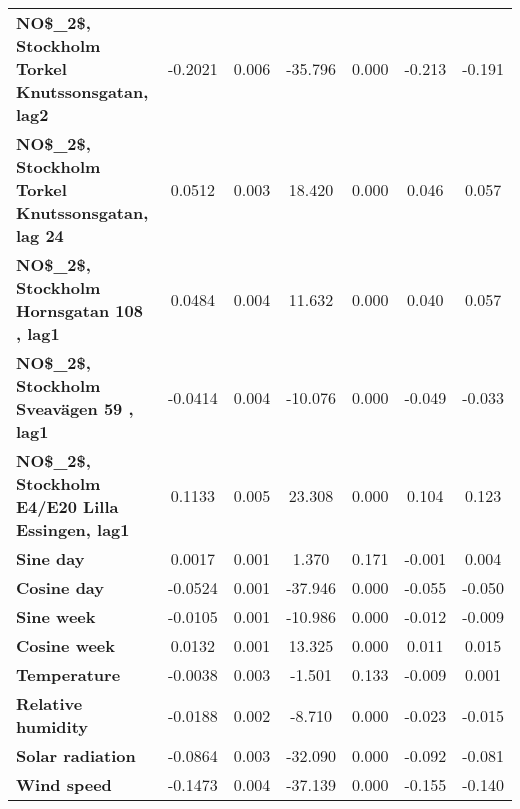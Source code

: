 \begin{landscape}
\begin{table}
\begin{center}
\begin{tabular}{lcccccc}
\textbf{NO\$\_2\$, Stockholm Torkel Knutssonsgatan, lag2}   &      -0.2021  &        0.006     &   -35.796  &         0.000        &       -0.213    &       -0.191     \\
\textbf{NO\$\_2\$, Stockholm Torkel Knutssonsgatan, lag 24} &       0.0512  &        0.003     &    18.420  &         0.000        &        0.046    &        0.057     \\
\textbf{NO\$\_2\$, Stockholm Hornsgatan 108 , lag1}         &       0.0484  &        0.004     &    11.632  &         0.000        &        0.040    &        0.057     \\
\textbf{NO\$\_2\$, Stockholm Sveavägen 59 , lag1}           &      -0.0414  &        0.004     &   -10.076  &         0.000        &       -0.049    &       -0.033     \\
\textbf{NO\$\_2\$, Stockholm E4/E20 Lilla Essingen, lag1}   &       0.1133  &        0.005     &    23.308  &         0.000        &        0.104    &        0.123     \\
\textbf{Sine day}                                           &       0.0017  &        0.001     &     1.370  &         0.171        &       -0.001    &        0.004     \\
\textbf{Cosine day}                                         &      -0.0524  &        0.001     &   -37.946  &         0.000        &       -0.055    &       -0.050     \\
\textbf{Sine week}                                          &      -0.0105  &        0.001     &   -10.986  &         0.000        &       -0.012    &       -0.009     \\
\textbf{Cosine week}                                        &       0.0132  &        0.001     &    13.325  &         0.000        &        0.011    &        0.015     \\
\textbf{Temperature}                                        &      -0.0038  &        0.003     &    -1.501  &         0.133        &       -0.009    &        0.001     \\
\textbf{Relative humidity}                                  &      -0.0188  &        0.002     &    -8.710  &         0.000        &       -0.023    &       -0.015     \\
\textbf{Solar radiation}                                    &      -0.0864  &        0.003     &   -32.090  &         0.000        &       -0.092    &       -0.081     \\
\textbf{Wind speed}                                         &      -0.1473  &        0.004     &   -37.139  &         0.000        &       -0.155    &       -0.140     \\

\end{tabular}
\end{center}
\end{table}
\end{landscape}
